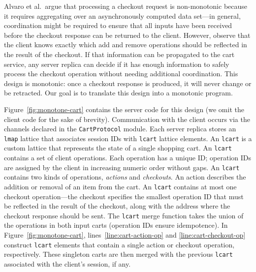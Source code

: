 Alvaro et al.\ argue that processing a checkout request is non-monotonic because
it requires aggregating over an asynchronously computed data set---in general,
coordination might be required to ensure that all inputs have been received
before the checkout response can be returned to the client. However, observe
that the client knows exactly which add and remove operations should be
reflected in the result of the checkout. If that information can be propagated
to the cart service, any server replica can decide if it has enough information
to safely process the checkout operation without needing additional
coordination. This design is monotonic: once a checkout response is produced, it
will never change or be retracted. Our goal is to translate this design into a
monotonic \lang program.


Figure~\ref{fig:monotone-cart} contains the server code for this design (we omit
the client code for the sake of brevity). Communication with the client occurs
via the channels declared in the \texttt{CartProtocol} module. Each server
replica stores an \texttt{lmap} lattice that associates session IDs with
\texttt{lcart} lattice elements. An \texttt{lcart} is a custom lattice that
represents the state of a single shopping cart. An \texttt{lcart} contains a set
of client operations. Each operation has a unique ID; operation IDs are assigned
by the client in increasing numeric order without gaps. An \texttt{lcart}
contains two kinds of operations, \emph{actions} and \emph{checkouts}. An action
describes the addition or removal of an item from the cart. An \texttt{lcart}
contains at most one checkout operation---the checkout specifies the smallest
operation ID that must be reflected in the result of the checkout, along with
the address where the checkout response should be sent. The \texttt{lcart} merge
function takes the union of the operations in both input carts (operation IDs
ensure idempotence). In Figure~\ref{fig:monotone-cart},
lines~\ref{line:cart-action-op} and \ref{line:cart-checkout-op} construct
\texttt{lcart} elements that contain a single action or checkout operation,
respectively. These singleton carts are then merged with the previous
\texttt{lcart} associated with the client's session, if any.

